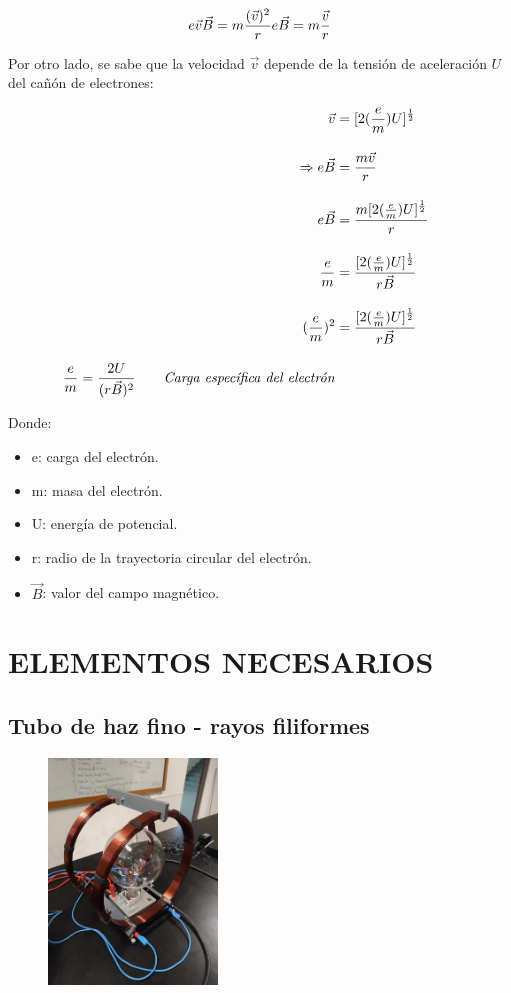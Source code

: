 \documentclass[a4paper]{article}
\begin{document}
    \begin{equation}
        e \vec{v} \vec{B} = m {\frac {(\vec{v})^2}{r}} \\ 
        e \vec{B} = m \frac {\vec{v}}{r}
    \end{equation}

    \indent Por otro lado, se sabe que la velocidad $\vec{v}$ depende de la tensión de aceleración $U$ del cañón de electrones:

    \begin{align}
        \vec{v} &= [2 (\frac {e}{m}) U]^{\frac{1}{2}} \tag*{} \\[10pt]
        \Rightarrow e \vec{B} &= \frac{m {\vec{v}}}{r} \tag*{} \\[10pt]
        e \vec{B} &= \frac{m[2 (\frac {e}{m}) U]^{\frac{1}{2}}}{r} \tag*{} \\[10pt]
        \frac{e}{m} &= \frac{[2 (\frac {e}{m}) U]^{\frac{1}{2}}}{r \vec{B}} \tag*{} \\[10pt]
        (\frac{e}{m})^{2} &= \frac{[2 (\frac {e}{m}) U]^{\frac{1}{2}}}{r \vec{B}} \tag*{} \\[10pt]
        \frac{e}{m} = \frac{2 U}{(r \vec{B})^2} \tag*{\textit{Carga específica del electrón}}
    \end{align}

    \indent Donde:
    \begin{itemize}
        \item e: carga del electrón.
        \item m: masa del electrón.
        \item U: energía de potencial.
        \item r: radio de la trayectoria circular del electrón.
        \item $\vec{B}$: valor del campo magnético.
    \end{itemize}

\newpage
\noindent
\thispagestyle{fancy}

\section{ELEMENTOS NECESARIOS}

        \subsection{Tubo de haz fino - rayos filiformes}

        \begin{figure}[h!]
            \centering
            \includegraphics[width = 4.5cm] {../imagenes/tubodehazfino.jpg}
        \end{figure}
\end{document}
